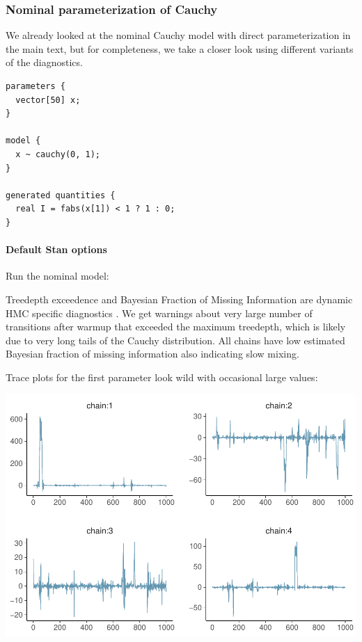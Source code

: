 \documentclass[american,]{article}
\let\oldparagraph\paragraph
\renewcommand{\paragraph}[1]{\oldparagraph{#1}\mbox{}}
\begin{document}
\hypertarget{nominal-parameterization-of-cauchy-1}{%
\subsubsection*{Nominal parameterization of
Cauchy}\label{nominal-parameterization-of-cauchy-1}}

We already looked at the nominal Cauchy model with direct
parameterization in the main text, but for completeness, we take a
closer look using different variants of the diagnostics.

\begin{verbatim}
parameters {
  vector[50] x;
}

model {
  x ~ cauchy(0, 1);
}

generated quantities {
  real I = fabs(x[1]) < 1 ? 1 : 0;
}
\end{verbatim}

\hypertarget{default-stan-options-1}{%
\paragraph{Default Stan options}\label{default-stan-options-1}}

Run the nominal model:

Treedepth exceedence and Bayesian Fraction of Missing Information are
dynamic HMC specific diagnostics \citep{betancourt2017conceptual}. We
get warnings about very large number of transitions after warmup that
exceeded the maximum treedepth, which is likely due to very long tails
of the Cauchy distribution. All chains have low estimated Bayesian
fraction of missing information also indicating slow mixing.

Trace plots for the first parameter look wild with occasional large
values:

\includegraphics{graphics/trace-fit-nom-1.pdf}
\end{document}
